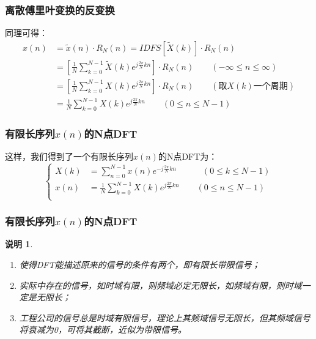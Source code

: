 \documentclass[notheorems,compress,mathserif,table]{beamer}
\newtheorem{shuoming}{说明}
\begin{document}
\begin{frame}[shrink]\frametitle{离散傅里叶变换的反变换}%
    同理可得：
    \begin{equation*}
    \begin{split}
    x(n) &= \tilde{x}(n)\cdot R_N(n) =  IDFS[\tilde{X}(k)]\cdot R_N(n)\\
          &= \left[ \frac{1}{N}\sum_{k=0}^{N-1} \tilde{X}(k)e^{j\frac{2\pi}{N}kn}\right]\cdot R_N(n)  \quad\quad (-\infty \leq n \leq \infty)\\
          &= \left[ \frac{1}{N}\sum_{k=0}^{N-1}X(k)e^{j\frac{2\pi}{N}kn}\right]\cdot R_N(n)  \quad\quad  (\mbox{取$X(k)$一个周期})\\
          &=  \frac{1}{N}\sum_{k=0}^{N-1}X(k)e^{j\frac{2\pi}{N}kn}   \quad\quad (0 \leq n \leq N-1)
    \end{split}
    \end{equation*}
\end{frame}

\begin{frame}[shrink]\frametitle{有限长序列$x(n)$的N点DFT}%
    这样，我们得到了一个有限长序列$x(n)$的N点DFT为：
    \begin{equation*}
           \left\{ \begin{aligned}
               X(k) &=  \sum_{n=0}^{N-1}x(n)e^{-j\frac{2\pi}{N}kn}  \quad\quad\quad (0 \leq k \leq N-1) \\
               x(n) &=   \frac{1}{N}\sum_{k=0}^{N-1}X(k)e^{j\frac{2\pi}{N}kn} \quad\quad (0 \leq n \leq N-1)\\
           \end{aligned} \right.
    \end{equation*}
\end{frame}    
    
    
\begin{frame}[shrink]\frametitle{有限长序列$x(n)$的N点DFT}%
\begin{shuoming}
    \begin{enumerate}
      \item 使得DFT能描述原来的信号的条件有两个，即有限长带限信号；
      \item 实际中存在的信号，如时域有限，则频域必定无限长，如频域有限，则时域一定是无限长；
      \item 工程公司的信号总是时域有限信号，理论上其频域信号无限长，但其频域信号将衰减为0，可将其截断，近似为带限信号。
    \end{enumerate}
\end{shuoming}
\end{frame}
\end{document}

